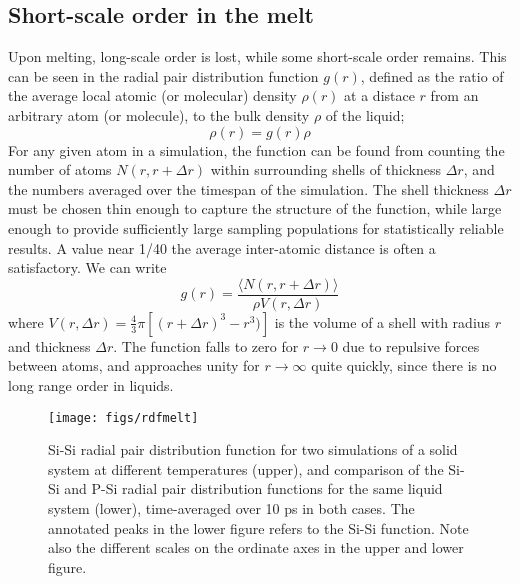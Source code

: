 \documentclass[11pt,bibliography=totoc,index=totoc]{scrbook}   %
\begin{document}
%
\subsection{Short-scale order in the melt}\label{sec:pair-distribution}
%

Upon melting, long-scale order is lost, while some short-scale order remains. 
This can be seen in the radial pair distribution function $g(r)$, defined as the ratio of the average local atomic (or molecular) density $\rho(r)$ at a distace $r$ from an arbitrary atom (or molecule), to the bulk density $\rho$ of the liquid;\cite{Kirkwood:1968}
\begin{equation}
  \rho(r) = g(r) \rho
\end{equation}
For any given atom in a simulation, the function can be found from counting the number of atoms $N(r,r+\Delta r)$ within surrounding shells of thickness $\Delta r$, and the numbers averaged over the timespan of the simulation. 
The shell thickness $\Delta r$ must be chosen thin enough to capture the structure of the function, 
while large enough to provide sufficiently large sampling populations for statistically reliable results. 
A value near 1/40 the average inter-atomic distance is often a satisfactory.\cite[263]{Haile:1992} 
We can write
\begin{equation}
    g(r) = \frac{\langle N(r,r+\Delta r) \rangle}{\rho V(r,\Delta r)}
  \label{eq:gofr}
\end{equation}
where $V(r,\Delta r) = \frac{4}{3}\pi [(r+\Delta r)^3 - r^3)]$ is the volume of a shell with radius $r$ and thickness $\Delta r$.
The function falls to zero for $r\to 0$ due to repulsive forces between atoms, and approaches unity for $r\to\infty$ quite quickly, since there is no long range order in liquids.

% 
\begin{figure}[htbp]
  \centering
  \texttt{[image: figs/rdfmelt]}
  \caption{Si-Si radial pair distribution function for two simulations of a solid system at different temperatures (upper), and
  comparison of the Si-Si and P-Si radial pair distribution functions for the same liquid system (lower), 
  time-averaged over 10 ps in both cases. 
  The annotated peaks in the lower figure refers to the Si-Si function.
  Note also the different scales on the ordinate axes in the upper and lower figure.}
  \label{fig:pcf}
\end{figure}
\end{document}

